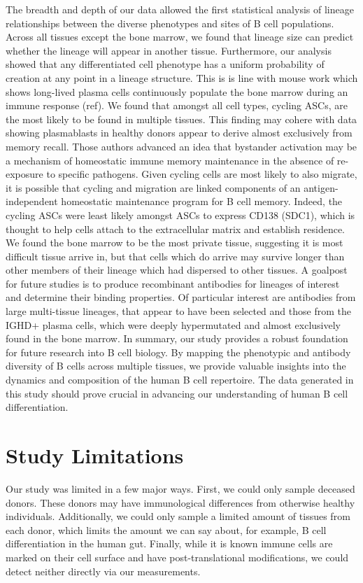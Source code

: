 The breadth and depth of our data allowed the first statistical analysis of lineage relationships between the diverse phenotypes and sites of B cell populations. Across all tissues except the bone marrow, we found that lineage size can predict whether the lineage will appear in another tissue. Furthermore, our analysis showed that any differentiated cell phenotype has a uniform probability of creation at any point in a lineage structure. This is is line with mouse work which shows long-lived plasma cells continuously populate the bone marrow during an immune response (ref). We found that amongst all cell types, cycling ASCs, are the most likely to be found in multiple tissues. This finding may cohere with data showing plasmablasts in healthy donors appear to derive almost exclusively from memory recall\cite{phad_lanza_2022clonal}. Those authors advanced an idea that bystander activation may be a mechanism of homeostatic immune memory maintenance in the absence of re-exposure to specific pathogens. Given cycling cells are most likely to also migrate, it is possible that cycling and migration are linked components of an antigen-independent homeostatic maintenance program for B cell memory. Indeed, the cycling ASCs were least likely amongst ASCs to express CD138 (SDC1), which is thought to help cells attach to the extracellular matrix and establish residence. We found the bone marrow to be the most private tissue, suggesting it is most difficult tissue arrive in, but that cells which do arrive may survive longer than other members of their lineage which had dispersed to other tissues.  
A goalpost for future studies is to produce recombinant antibodies for lineages of interest and determine their binding properties. Of particular interest are antibodies from large multi-tissue lineages, that appear to have been selected\cite{neher2014predicting} and those from the IGHD+ plasma cells, which were deeply hypermutated and almost exclusively found in the bone marrow.
In summary, our study provides a robust foundation for future research into B cell biology. By mapping the phenotypic and antibody diversity of B cells across multiple tissues, we provide valuable insights into the dynamics and composition of the human B cell repertoire. The data generated in this study should prove crucial in advancing our understanding of human B cell differentiation.

\section{Study Limitations}
Our study was limited in a few major ways. First, we could only sample deceased donors. These donors may have immunological differences from otherwise healthy individuals. Additionally, we could only sample a limited amount of tissues from each donor, which limits the amount we can say about, for example, B cell differentiation in the human gut. Finally, while it is known immune cells are marked on their cell surface and have post-translational modifications, we could detect neither directly via our measurements.

